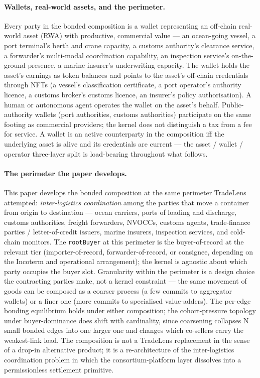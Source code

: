 \documentclass[11pt,a4paper]{article}
\theoremstyle{definition}
\theoremstyle{remark}
\begin{document}
\paragraph{Wallets, real-world assets, and the perimeter.}
Every party in the bonded composition is a wallet representing an
off-chain real-world asset (RWA) with productive, commercial value
--- an ocean-going vessel, a port terminal's berth and crane
capacity, a customs authority's clearance service, a forwarder's
multi-modal coordination capability, an inspection service's
on-the-ground presence, a marine insurer's underwriting capacity.
The wallet holds the asset's earnings as token balances and points
to the asset's off-chain credentials through NFTs (a vessel's
classification certificate, a port operator's authority licence, a
customs broker's customs licence, an insurer's policy authorisation).
A human or autonomous agent operates the wallet on the asset's
behalf. Public-authority wallets (port authorities, customs
authorities) participate on the same footing as commercial
providers; the kernel does not distinguish a tax from a fee for
service. A wallet is an active counterparty in the composition
iff the underlying asset is alive and its credentials are
current --- the asset / wallet / operator three-layer split is
load-bearing throughout what follows.

\paragraph{The perimeter the paper develops.}
This paper develops the bonded composition at the same perimeter
TradeLens attempted: \emph{inter-logistics coordination} among the
parties that move a container from origin to destination ---
ocean carriers, ports of loading and discharge, customs
authorities, freight forwarders, NVOCCs, customs agents,
trade-finance parties / letter-of-credit issuers, marine insurers,
inspection services, and cold-chain monitors. The
\texttt{rootBuyer} at this perimeter is the buyer-of-record at
the relevant tier (importer-of-record, forwarder-of-record, or
consignee, depending on the Incoterm and operational arrangement);
the kernel is agnostic about which party occupies the buyer slot.
Granularity within the perimeter is a design choice the
contracting parties make, not a kernel constraint --- the same
movement of goods can be composed as a coarser process (a few
commits to aggregator wallets) or a finer one (more commits to
specialised value-adders). The per-edge bonding equilibrium holds
under either composition; the cohort-pressure topology under
buyer-dominance does shift with cardinality, since coarsening
collapses N small bonded edges into one larger one and changes
which co-sellers carry the weakest-link load. The composition is not a TradeLens
replacement in the sense of a drop-in alternative product; it is a
re-architecture of the inter-logistics coordination problem in
which the consortium-platform layer dissolves into a
permissionless settlement primitive.
\end{document}

